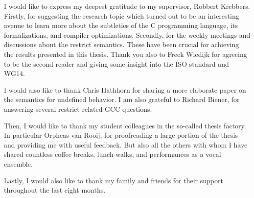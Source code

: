 \begin{acknowledgements}
I would like to express my deepest gratitude to my supervisor, \drcap Robbert Krebbers.
Firstly, for suggesting the research topic which turned out to be an interesting avenue to learn more about the subtleties of the C programming language, its formalizations, and compiler optimizations.
Secondly, for the weekly meetings and discussions about the restrict semantics.
These have been crucial for achieving the results presented in this thesis.
Thank you also to \drcap Freek Wiedijk for agreeing to be the second reader and giving some insight into
the ISO standard and WG14.

I would also like to thank \drcap Chris Hathhorn for sharing a more elaborate paper on the \cink{} semantics
for undefined behavior.
I am also grateful to \drcap Richard Biener, for answering several restrict-related GCC questions.

Then, I would like to thank my student colleagues in the so-called thesis factory.
In particular Orpheas van Rooij, for proofreading a large portion of the thesis and providing me with useful feedback.
But also all the others with whom I have shared countless coffee breaks, lunch walks, and performances as a vocal ensemble.

Lastly, I would also like to thank my family and friends for their support throughout the last eight months.
\end{acknowledgements}
